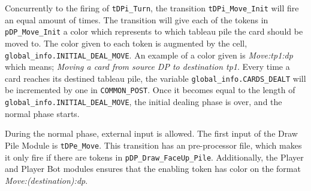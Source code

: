 \documentclass[runningheads,a4paper]{llncs}
\newcommand{\GPenSIM}{../GPenSIM}
\begin{document}
Concurrently to the firing of \verb!tDPi_Turn!, the transition \verb!tDPi_Move_Init! will fire an equal amount of times. The transition will give each of the tokens in \verb!pDP_Move_Init! a color which represents to which tableau pile the card should be moved to. The color given to each token is augmented by the cell, \verb!global_info.INITIAL_DEAL_MOVE!. An example of a color given is \emph{Move:\ac{tp}1:\ac{dp}} which means; \textit{Moving a card from source DP to destination \ac{tp}1}. Every time a card reaches its destined tableau pile, the variable \verb!global_info.CARDS_DEALT! will be incremented by one in \verb!COMMON_POST!. Once it becomes equal to the length of \verb!global_info.INITIAL_DEAL_MOVE!, the initial dealing phase is over, and the normal phase starts.
\newline

During the normal phase, external input is allowed. The first input of the Draw Pile Module is \verb!tDPe_Move!. This transition has an pre-processor file, which makes it only fire if there are tokens in \verb!pDP_Draw_FaceUp_Pile!. Additionally, the Player and Player Bot modules ensures that the enabling token has color on the format \textit{Move:(destination):\ac{dp}}.

\end{document}
